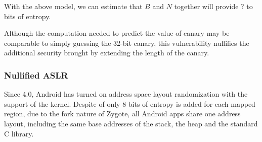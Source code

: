 With the above model, we can estimate that $B$ and $N$ together will provide ? to ~ bits of entropy.

Although the computation needed to predict the value of canary may be comparable to simply guessing the 32-bit canary, this vulnerability nullifies the additional security brought by extending the length of the canary.

\subsubsection{Nullified ASLR}

Since 4.0, Android has turned on address space layout randomization with the support of the kernel. Despite of only 8 bits of entropy is added for each mapped region, due to the fork nature of Zygote, all Android apps share one address layout, including the same base addresses of the stack, the heap and the standard C library.

